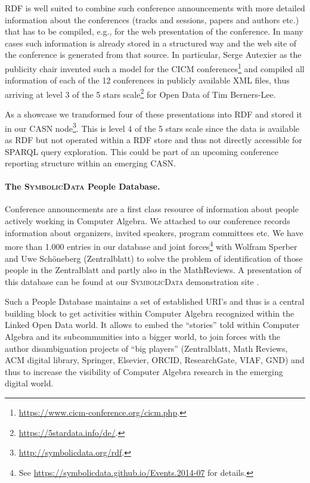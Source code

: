 \documentclass[a4paper,11pt]{article}
\def\SD{\textsc{SymbolicData}}
\begin{document}
RDF is well suited to combine such conference announcements with more detailed
information about the conferences (tracks and sessions, papers and authors
etc.) that has to be compiled, e.g., for the web presentation of the
conference.  In many cases such information is already stored in a structured
way and the web site of the conference is generated from that source.  In
particular, Serge Autexier as the publicity chair invented such a model for the
CICM conferences\footnote{\url{https://www.cicm-conference.org/cicm.php}.} and
compiled all information of each of the 12 conferences in publicly available
XML files, thus arriving at level 3 of the 5 stars
scale\footnote{\url{https://5stardata.info/de/}.} for Open Data of Tim
Berners-Lee.

As a showcase we transformed four of these presentations into RDF and stored it
in our CASN node\footnote{\url{http://symbolicdata.org/rdf}.}. This is level 4
of the 5 stars scale since the data is available as RDF but not operated within
a RDF store and thus not directly accessible for SPARQL query exploration.
This could be part of an upcoming conference reporting structure within an
emerging CASN. 

\paragraph{The {\SD} People Database.}
Conference announcements are a first class resource of information about people
actively working in Computer Algebra.  We attached to our conference records
information about organizers, invited speakers, program committees etc.  We
have more than 1.000 entries in our database and joint forces\footnote{See
  \url{https://symbolicdata.github.io/Events.2014-07} for details.} with
Wolfram Sperber and Uwe Sch\"oneberg (Zentralblatt) to solve the problem of
identification of those people in the Zentralblatt and partly also in the
MathReviews.  A presentation of this database can be found at our {\SD}
demonstration site \cite{sdinfo}.

Such a People Database maintains a set of established URI's and thus is a
central building block to get activities within Computer Algebra recognized
within the Linked Open Data world.  It allows to embed the ``stories'' told
within Computer Algebra and its subcommunities into a bigger world, to join
forces with the author disambiguation projects of ``big players''
(Zentralblatt, Math Reviews, ACM digital library, Springer, Elsevier, ORCID,
ResearchGate, VIAF, GND) and thus to increase the visibility of Computer
Algebra research in the emerging digital world.
\end{document}
